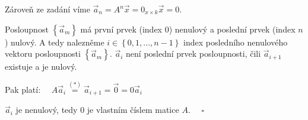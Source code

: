 \documentclass[12pt]{article}
\begin{document}
\begin{enumerate}
    Zároveň ze zadání víme $\vec{a}_n = A^n\vec{x} = 0_{x\times k}\vec{x} = 0$.

    Posloupnost $\left\{\vec{a}_m\right\}$ má první prvek (index $0$) nenulový a poslední prvek (index $n$) nulový.
    A tedy nalezněme $i\in\left\{0,1,...,n-1\right\}$ index posledního nenulového vektoru posloupnosti $\left\{\vec{a}_m\right\}$.
    $\vec{a}_i$ není poslední prvek posloupnosti, čili $\vec{a}_{i+1}$ existuje a je nulový.

    Pak platí: $\quad A\vec{a}_{i} \overset{(*)}{=} \vec{a}_{i+1} = \vec{0} = 0\vec{a}_{i}$

    $\vec{a}_i$ je nenulový, tedy $0$ je vlastním číslem matice $A$. $\quad\square$

\end{enumerate}
  
\end{document}

